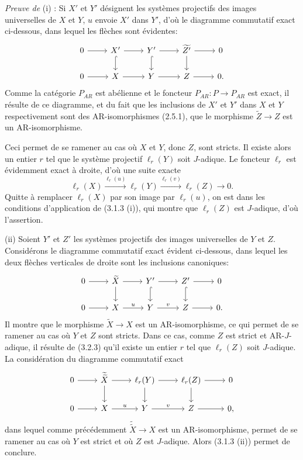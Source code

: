 \emph{Preuve de} (i) : Si $X'$ et $Y'$ désignent les systèmes projectifs des images universelles de $X$ et $Y$, $u$ envoie $X'$ dans $Y'$, d'où le diagramme commutatif exact ci-dessous, dans lequel les flèches sont évidentes:
\[
\begin{tikzcd}
0 \arrow[r] & X' \arrow[r] \arrow[d,hook] & Y' \arrow[r] \arrow[d,hook] & \widetilde{Z'} \arrow[r] \arrow[d] & 0\\
0 \arrow[r] & X \arrow[r] & Y \arrow[r] & Z \arrow[r] & 0 .
\end{tikzcd}
\]
Comme la catégorie $P_{AR}$ est abélienne et le foncteur 
$P_{AR}\colon P\to P_{AR}$ est
exact, il résulte de ce diagramme, et du fait que les inclusions de $X'$ et $Y'$ dans $X$ et $Y$ respectivement sont des AR-isomorphismes (2.5.1), que le morphisme $\widetilde Z\to Z$ est un AR-isomorphisme.

Ceci permet de se ramener au cas où $X$ et $Y$, donc $Z$, sont stricts. Il existe alors un entier $r$ tel que le système projectif $\ell_r(Y)$ soit $J$-adique. Le foncteur $\ell_r$ est évidemment exact à droite, d'où une suite exacte
\[
\ell_r(X)\stackrel{\ell_r(u)}{\longrightarrow}\ell_r(Y)\stackrel{\ell_r(v)}{\longrightarrow}\ell_r(Z)\longrightarrow0.
\]
Quitte à remplacer $\ell_r(X)$ par son image par $\ell_r(u)$, on est dans les conditions d'application de (3.1.3 (i)), qui montre que $\ell_r(Z)$ est $J$-adique, d'où l'assertion.

(ii) Soient $Y'$ et $Z'$ les systèmes projectifs des images universelles de $Y$ et $Z$. Considérons le diagramme commutatif exact évident ci-dessous, dans lequel les deux flèches verticales de droite sont les inclusions canoniques:
\[
\begin{tikzcd}
0 \arrow[r] & \widetilde X \arrow[r] \arrow[d] & Y' \arrow[r] \arrow[d,hook] & Z' \arrow[r] \arrow[d,hook] & 0\\
0 \arrow[r] & X \arrow[r,"u"] & Y \arrow[r,"v"] & Z \arrow[r] & 0 .
\end{tikzcd}
\]
Il montre que le morphisme $\widetilde X\to X$ est un AR-isomorphisme, ce qui permet de se ramener au cas où $Y$ et $Z$ sont stricts. Dans ce cas, comme $Z$ est strict et AR-$J$-adique, il résulte de (3.2.3) qu'il existe un entier $r$ tel que $\ell_r(Z)$ soit $J$-adique. La considération du diagramme commutatif exact
\[
\begin{tikzcd}
0 \arrow[r] & \widetilde{\widetilde X} \arrow[r] \arrow[d] & \ell_r(Y) \arrow[r] \arrow[d] & \ell_r(Z) \arrow[r] \arrow[d] & 0\\
0 \arrow[r] & X \arrow[r,"u"] & Y \arrow[r,"v"] & Z \arrow[r] & 0,
\end{tikzcd}
\]
dans lequel comme précédemment $\widetilde{\widetilde X}\to X$ est un AR-isomorphisme, permet de se ramener au cas où $Y$ est strict et où $Z$ est $J$-adique. Alors 
(3.1.3 (ii))
permet de conclure.

